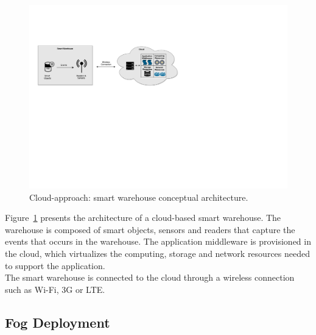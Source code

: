 \begin{figure}[ht!]
  \centering
  \includegraphics[width=\textwidth]{./images/solution_cloud_architecture}
  \caption[Cloud-approach: conceptual architecture.]{Cloud-approach: smart warehouse conceptual architecture.}
  \label{fig:solution_cloud_architecture}
\end{figure}

Figure~\ref{fig:solution_cloud_architecture} presents the architecture of a cloud-based smart warehouse.
The warehouse is composed of smart objects, sensors and readers that capture the events that occurs
in the warehouse. The application middleware is provisioned in the cloud, which virtualizes the computing,
storage and network resources needed to support the application.\\

The smart warehouse is connected to the cloud through a wireless connection such as Wi-Fi, 3G or
\gls{LTE}.

\subsection{Fog Deployment}
\label{sub:sol_fog}

